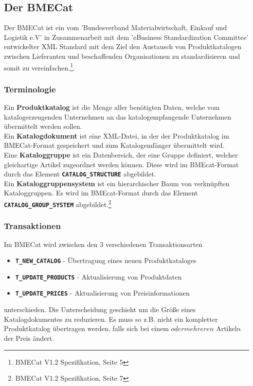 	\subsection{Der BMECat}
	
	Der BMECat ist ein vom 'Bundesverband Materialwirtschaft, Einkauf und Logistik e.V' in Zusammenarbeit mit dem 'eBusiness Standardization Committee' entwickelter XML
	Standard mit dem Ziel den Austausch von Produktkatalogen zwischen Lieferanten und beschaffenden Organisationen zu standardisieren und somit zu vereinfachen.\footnote{BMECat V1.2 Spezifikation, Seite 5}. 
	
	\subsubsection{Terminologie}
	Ein \textbf{Produktkatalog} ist die Menge aller benötigten Daten, welche vom katalogerzeugenden Unternehmen an das katalogempfangende Unternehmen übermittelt werden sollen.\\
	Ein \textbf{Katalogdokument} ist eine XML-Datei, in der der Produktkatalog im BMECat-Format gespeichert und zum Katalogemfänger übermittelt wird.\\
	Eine \textbf{Kataloggruppe} ist ein Datenbereich, der eine Gruppe definiert, welcher gleichartige Artikel zugeordnet werden können. Diese wird im BMEcat-Format durch das Element \texttt{\textbf{CATALOG\_STRUCTURE}} abgebildet.\\
	Ein \textbf{Kataloggruppensystem} ist ein hierarchischer Baum von verknüpften Kataloggruppen. Es wird
	im BMEcat-Format durch das Element \texttt{\textbf{CATALOG\_GROUP\_SYSTEM}} abgebildet.\footnote{BMECat V1.2 Spezifikation, Seite 7}
	
	\subsubsection{Transaktionen}
	Im BMECat wird zwischen den 3 verschiedenen Transaktionsarten
	\begin{itemize}
	\item \texttt{\textbf{T\_NEW\_CATALOG}} - Übertragung eines neuen Produktkataloges
	\item \texttt{\textbf{T\_UPDATE\_PRODUCTS}} - Aktualisierung von Produktdaten
	\item \texttt{\textbf{T\_UPDATE\_PRICES}} - Aktualisierung von Preisinformationen
	\end{itemize} 
	unterschieden. Die Unterscheidung geschieht um die Größe eines Katalogdokumentes zu reduzieren. Es muss so z.B. nicht ein kompletter Produktkatalog übertragen werden, falls sich bei einem \(oder mehreren\) Artikel\(n\) der Preis ändert.
	
